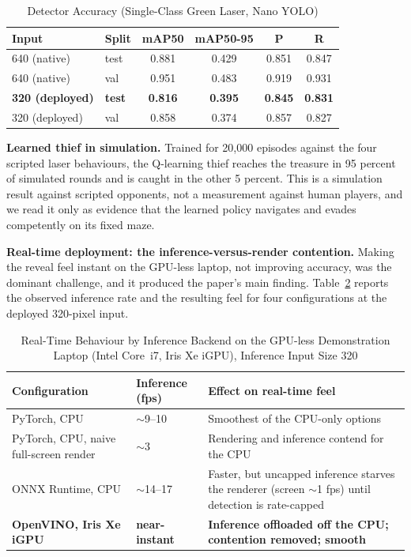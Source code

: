 \documentclass[conference]{IEEEtran}
\begin{document}
\begin{table}[t]
\caption{Detector Accuracy (Single-Class Green Laser, Nano YOLO)}
\label{tab:detect}
\begin{center}
\renewcommand{\arraystretch}{1.3}
\begin{tabular}{|p{1.5cm}|p{0.9cm}|c|c|c|c|}
\hline
\textbf{Input} & \textbf{Split} & \textbf{mAP50} & \textbf{mAP50-95} &
\textbf{P} & \textbf{R} \\
\hline
640 (native) & test & 0.881 & 0.429 & 0.851 & 0.847 \\
\hline
640 (native) & val  & 0.951 & 0.483 & 0.919 & 0.931 \\
\hline
\textbf{320 (deployed)} & \textbf{test} & \textbf{0.816} & \textbf{0.395} &
\textbf{0.845} & \textbf{0.831} \\
\hline
320 (deployed) & val  & 0.858 & 0.374 & 0.857 & 0.827 \\
\hline
\end{tabular}
\end{center}
\end{table}

\noindent\textbf{Learned thief in simulation.} Trained for 20{,}000 episodes
against the four scripted laser behaviours, the Q-learning thief reaches the
treasure in 95 percent of simulated rounds and is caught in the other 5 percent.
This is a simulation result against scripted opponents, not a measurement against
human players, and we read it only as evidence that the learned policy navigates
and evades competently on its fixed maze.

\noindent\textbf{Real-time deployment: the inference-versus-render contention.}
Making the reveal feel instant on the GPU-less laptop, not improving accuracy, was
the dominant challenge, and it produced the paper's main finding.
Table~\ref{tab:fps} reports the observed inference rate and the resulting feel for
four configurations at the deployed 320-pixel input.

\begin{table}[t]
\caption{Real-Time Behaviour by Inference Backend on the GPU-less Demonstration
Laptop (Intel Core~i7, Iris Xe iGPU), Inference Input Size 320}
\label{tab:fps}
\begin{center}
\renewcommand{\arraystretch}{1.3}
\begin{tabular}{|p{2.95cm}|p{1.35cm}|p{2.7cm}|}
\hline
\textbf{Configuration} & \textbf{Inference (fps)} & \textbf{Effect on real-time feel} \\
\hline
PyTorch, CPU & $\sim$9--10 & Smoothest of the CPU-only options \\
\hline
PyTorch, CPU, naive full-screen render & $\sim$3 & Rendering and inference contend for the CPU \\
\hline
ONNX Runtime, CPU & $\sim$14--17 & Faster, but uncapped inference starves the renderer (screen $\sim$1 fps) until detection is rate-capped \\
\hline
\textbf{OpenVINO, Iris Xe iGPU} & \textbf{near-instant} & \textbf{Inference offloaded off the CPU; contention removed; smooth} \\
\hline
\end{tabular}
\end{center}
\end{table}
\end{document}
